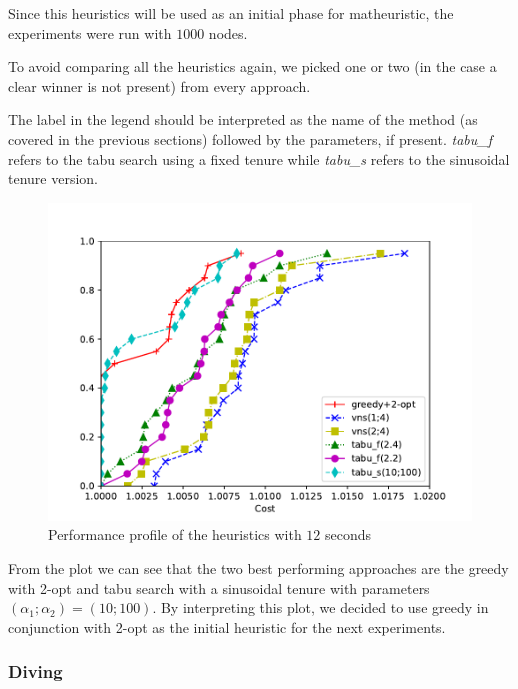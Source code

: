 \documentclass{article}
\begin{document}
Since this heuristics will be used as an initial phase for matheuristic,
the experiments were run with $1000$ nodes.

To avoid comparing all the heuristics again, we picked one or two (in the case
a clear winner is not present) from every approach.

The label in the legend should be interpreted as the name of the method (as
covered in the previous sections) followed by the parameters, if present.
\textit{tabu\_f} refers to the tabu search using a fixed tenure while
\textit{tabu\_s} refers to the sinusoidal tenure version.

\begin{figure}[ht]
        \caption{Performance profile of the heuristics with $12$ seconds}
        \label{fig:ht_best12}
        \centering
        \includegraphics[width=340pt]{assets/ht_best12.pdf}
\end{figure}

From the plot we can see that the two best performing approaches are the greedy
with 2-opt and tabu search with a sinusoidal tenure with parameters
$\left(\alpha_1; \alpha_2\right) = \left(10;100\right)$.
By interpreting this plot, we decided to use greedy in conjunction with 2-opt
as the initial heuristic for the next experiments.

\clearpage
\subsubsection{Diving}
\end{document}
